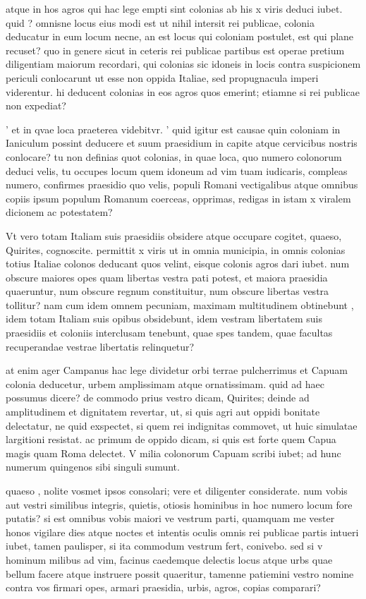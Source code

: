  atque in hos agros qui hac lege empti sint colonias ab his x viris deduci iubet. quid ? omnisne locus eius modi est ut nihil intersit rei publicae, colonia deducatur in eum locum necne, an est locus qui coloniam postulet, est qui plane recuset? quo in genere sicut in ceteris rei publicae partibus est operae pretium diligentiam maiorum recordari, qui colonias sic idoneis in locis contra suspicionem periculi conlocarunt ut esse non oppida Italiae, sed propugnacula imperi viderentur. hi deducent colonias in eos agros quos emerint; etiamne si rei publicae non expediat?

 ' et in qvae loca praeterea videbitvr. ' quid igitur est causae quin coloniam in Ianiculum possint deducere et suum praesidium in capite atque cervicibus nostris conlocare? tu non definias quot colonias, in quae loca, quo numero colonorum deduci velis, tu occupes locum quem idoneum ad vim tuam iudicaris, compleas numero, confirmes praesidio quo velis, populi Romani vectigalibus atque omnibus copiis ipsum populum Romanum coerceas, opprimas, redigas in istam x viralem dicionem ac potestatem?

 Vt vero totam Italiam suis praesidiis obsidere atque occupare cogitet, quaeso, Quirites, cognoscite. permittit x viris ut in omnia municipia, in omnis colonias totius Italiae colonos deducant quos velint, eisque colonis agros dari iubet. num obscure maiores opes quam libertas vestra pati potest, et maiora praesidia quaeruntur, num obscure regnum constituitur, num obscure libertas vestra tollitur? nam cum idem omnem pecuniam, maximam multitudinem obtinebunt , idem totam Italiam suis opibus obsidebunt, idem vestram libertatem suis praesidiis et coloniis interclusam tenebunt, quae spes tandem, quae facultas recuperandae vestrae libertatis relinquetur?

 at enim ager Campanus hac lege dividetur orbi terrae pulcherrimus et Capuam colonia deducetur, urbem amplissimam atque ornatissimam. quid ad haec possumus dicere? de commodo prius vestro dicam, Quirites; deinde ad amplitudinem et dignitatem revertar, ut, si quis agri aut oppidi bonitate delectatur, ne quid exspectet, si quem rei indignitas commovet, ut huic simulatae largitioni resistat. ac primum de oppido dicam, si quis est forte quem Capua magis quam Roma delectet. V milia colonorum Capuam scribi iubet; ad hunc numerum quingenos sibi singuli sumunt.

 quaeso , nolite vosmet ipsos consolari; vere et diligenter considerate. num vobis aut vestri similibus integris, quietis, otiosis hominibus in hoc numero locum fore putatis? si est omnibus vobis maiori ve vestrum parti, quamquam me vester honos vigilare dies atque noctes et intentis oculis omnis rei publicae partis intueri iubet, tamen paulisper, si ita commodum vestrum fert, conivebo. sed si v hominum milibus ad vim, facinus caedemque delectis locus atque urbs quae bellum facere atque instruere possit quaeritur, tamenne patiemini vestro nomine contra vos firmari opes, armari praesidia, urbis, agros, copias comparari?

